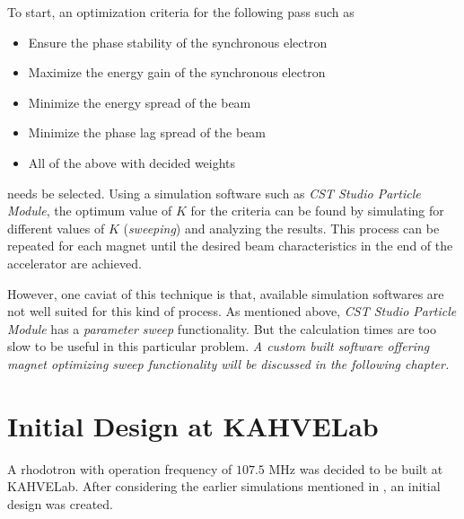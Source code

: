 \documentclass[a4paper,oneside,12pt]{report}
\numberwithin{equation}{chapter}
\begin{document}
To start, an optimization criteria for the following pass such as
\begin{itemize}
    \item Ensure the phase stability of the synchronous electron
    \item Maximize the energy gain of the synchronous electron
    \item Minimize the energy spread of the beam
    \item Minimize the phase lag spread of the beam
    \item All of the above with decided weights
\end{itemize}
needs be selected. Using a simulation software such as \textit{CST Studio Particle Module}, the optimum value of $K$ for the criteria can be found by simulating for different values of $K$ (\textit{sweeping}) and analyzing the results.
This process can be repeated for each magnet until the desired beam characteristics in the end of the accelerator are achieved.

However, one caviat of this technique is that, available simulation softwares are not well suited for this kind of process. As mentioned above, \textit{CST Studio Particle Module} has a \textit{parameter sweep} functionality.
But the calculation times are too slow to be useful in this particular problem. \textit{A custom built software offering magnet optimizing sweep functionality will be discussed in the following chapter.}



\newpage



\section{Initial Design at KAHVELab} 

A rhodotron with operation frequency of $107.5$ MHz was decided to be built at KAHVELab. 
After considering the earlier simulations mentioned in , an initial design was created.
\end{document}
